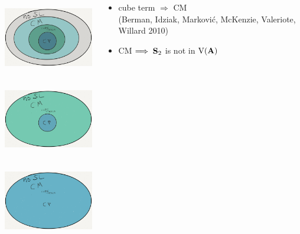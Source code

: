 \documentclass[xcolor=dvipsnames,9pt,handout,hide notes,mathserif]{beamer}
\begin{document}
{  \begin{columns}
    \begin{column}{0.4\textwidth}
      \begin{overprint}
        \begin{center}\includegraphics[height=1.25in]{figures/NoSL-cropped.png}\end{center}
        \begin{center}\includegraphics[height=1.25in]{figures/CubeEquiv-cropped.png}\end{center}
        \begin{center}\includegraphics[height=1.25in]{figures/CPequiv-cropped.png}\end{center}
      \end{overprint}
      \vskip1cm
    \end{column}
    \begin{column}{0.6\textwidth}
      \begin{overprint}
        \begin{itemize}
        \item cube term $\Longrightarrow$ CM\\[4pt]
          (Berman, Idziak, Markovi{\'c}, McKenzie, Valeriote, Willard 2010)
          \\[10pt]
        \item CM $\Longrightarrow \; \mathbf{S}_2$ is not in $\operatorname{V}(\mathbf{A})$\\[4pt]

\end{itemize}
\end{overprint}
\end{column}
\end{columns}}
\end{document}
